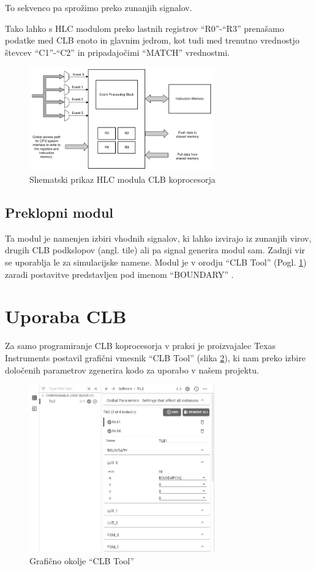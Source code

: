 \documentclass[a4paper]{article}
\begin{document}
\begin{sloppypar}
To sekvenco pa sprožimo preko zunanjih signalov.

Tako lahko s HLC modulom preko lastnih registrov
``R0''-``R3'' \cite[Pogl.~26.4.6]{mcu-ref-manual} prenašamo podatke med CLB
enoto in glavnim jedrom, kot tudi med trenutno vrednostjo števcev ``C1''-``C2''
in pripadajočimi ``MATCH'' vrednostmi.

\begin{figure}[htb]
    \centerline{\includegraphics[width=8cm]{shema_hlc}}
    \caption{Shematski prikaz HLC modula CLB koprocesorja
             \cite[Pogl.~26.4.6]{mcu-ref-manual}}
    \label{fig:hlc} 
\end{figure}

\subsection{Preklopni modul}
Ta modul je namenjen izbiri vhodnih signalov, ki lahko izvirajo iz zunanjih
virov, drugih CLB podkslopov (angl. tile) ali pa signal generira modul sam.
Zadnji vir se uporablja le za simulacijske namene. Modul je v orodju ``CLB
Tool'' (Pogl. \ref{sec:clb_tool}) zaradi postavitve predstavljen pod imenom
``BOUNDARY'' \cite[Pogl.~3.3]{clb-user-guide}.


\section{Uporaba CLB}\label{sec:clb_tool}
Za samo programiranje CLB koprocesorja v praksi je proizvajalec Texas
Instruments postavil grafični vmesnik ``CLB Tool'' (slika \ref{fig:clbtool}),
ki nam preko izbire določenih parametrov zgenerira kodo za uporabo v našem
projektu.

\begin{figure}[htb]
    \centerline{\includegraphics[width=8cm]{clbtool}}
    \caption{Grafično okolje ``CLB Tool''}
    \label{fig:clbtool} 
\end{figure} 


\end{sloppypar}
\end{document}
